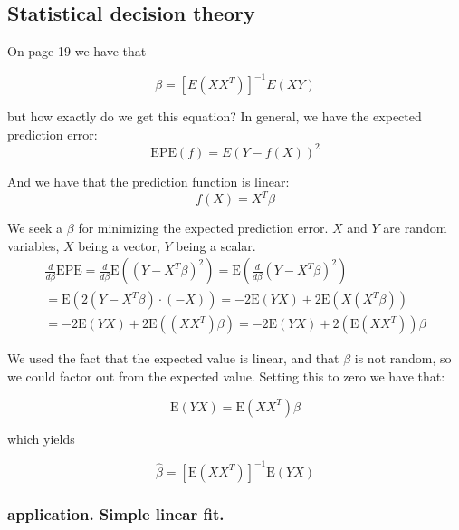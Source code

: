 \documentclass{article}
\begin{document}
\newpage
\subsection{Statistical decision theory} \label{linear_fit}

On page 19 we have that

\begin{equation} \label{eq:2_beta}
    \beta = [E(XX^T)]^{-1}E(XY)
\end{equation}

but how exactly do we get this equation? In general, we have the expected prediction error:
\begin{equation}
    \text{EPE}(f) = E(Y-f(X))^2
\end{equation}

And we have that the prediction function is linear:
\begin{equation}
    f(X) = X^T\beta
\end{equation}

We seek a $\beta$ for minimizing the expected prediction error. $X$ and $Y$ are random variables, $X$ being a vector, $Y$ being a scalar. 
\begin{equation}
    \begin{split}
        \frac{d}{d\beta}\text{EPE} = \frac{d}{d\beta} \text{E}((Y-X^T\beta)^2) = \text{E}\left( \frac{d}{d\beta} (Y-X^T\beta)^2\right)\\
        =\text{E} \left( 2(Y - X^T\beta)\cdot (-X) \right) = -2 \text{E} (YX) + 2 \text{E} (X(X^T\beta))\\
         = -2 \text{E} (YX) + 2 \text{E} ((XX^T)\beta) = -2 \text{E} (YX) + 2 (\text{E} (XX^T))\beta
    \end{split}
\end{equation}

We used the fact that the expected value is linear, and that $\beta$ is not random, so we could factor out from the expected value. Setting this to zero we have that:

\begin{equation}
    \text{E} (YX) = \text{E} (XX^T)\beta
\end{equation}

which yields

\begin{equation}
    \hat{\beta} = [\text{E} (XX^T)]^{-1} \text{E} (YX)
\end{equation}

\subsubsection{application. Simple linear fit.}
\end{document}
